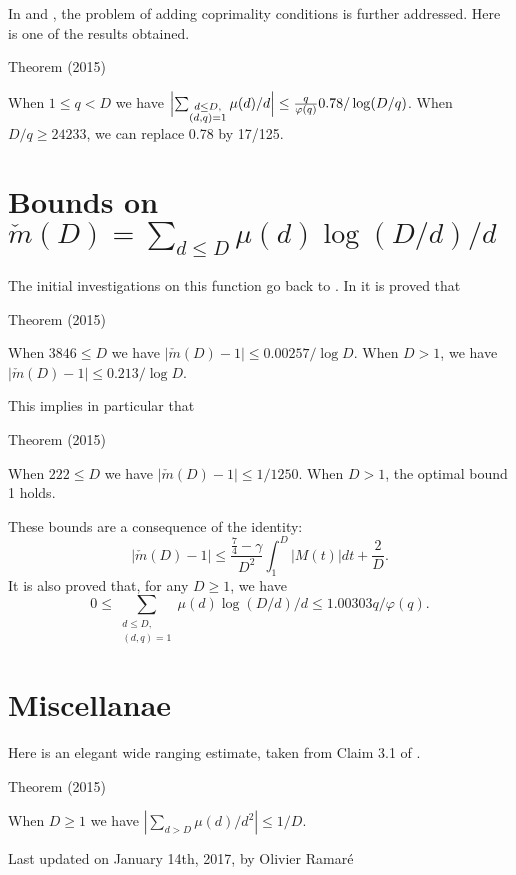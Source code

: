 In
\cite{Ramare*12-3} and
\cite{Ramare*12-5}, the
problem of adding coprimality conditions is further addressed.
Here is one of the results obtained.
\begin{thm}{Theorem (2015)}

  When $1\le q < D$ we have
  $\Bigl|\sum_{\substack{d\le D,\\ (d,q)=1}}\mu(d)/d\Bigr|\le
   \frac{q}{\varphi(q)}0.78/\log(D/q)$. When $D/q\ge 24233$, we can
  replace 0.78 by 17/125. 
\end{thm}




\section{Bounds on $\check{m}(D)=\sum_{d\le D}\mu(d)\log(D/d)/d$
}


The initial investigations on this function go back to 
 \cite{vonSterneck*02}.
In \cite{Ramare*12-5} it is
proved that
\begin{thm}{Theorem (2015)}

  When $3846 \le D$ we have
  $|\check{m}(D)-1|\le 0.00257/\log D$.
  When $D > 1$, we have
    $|\check{m}(D)-1|\le 0.213/\log D$.
\end{thm}


This implies in particular that
\begin{thm}{Theorem (2015)}

  When $222 \le D$ we have
  $|\check{m}(D)-1|\le 1/1250$.
  When $D > 1$, the optimal bound 1 holds.
\end{thm}


These bounds are a consequence of the identity:
$$
|\check{m}(D)-1|\le \frac{\frac74-\gamma}{D^2}\int_1^D|M(t)|dt+\frac{2}{D}.
$$
It is also proved that, for any $D\ge1$, we have
$$
0\le \sum_{\substack{d\le D,\\ (d,q)=1}}\mu(d)\log(D/d)/d
\le 1.00303 q/\varphi(q).
$$


\section{Miscellanae
}


Here is an elegant wide ranging estimate, taken from Claim 3.1 of
\cite{Trevino*15}.

\begin{thm}{Theorem (2015)}

When $D\ge1$ we have $|\sum_{d>D}\mu(d)/d^2|\le 1/D$.
\end{thm}







  
  Last updated on January 14th, 2017, by Olivier Ramar\'e
















